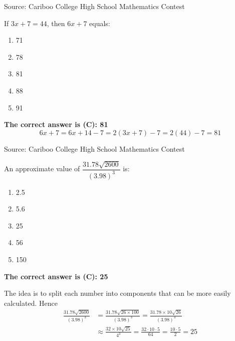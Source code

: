 \documentclass{article}
\begin{document}
\parindent=0cm
\parskip=6pt
\pagestyle{empty}



\scriptsize
Source: Cariboo College High School Mathematics Contest

\normalsize
If $3x+7=44$, then $6x+7$ equals:
\begin{enumerate}[noitemsep,topsep=0mm,leftmargin=*,widest=D,label=\Alph*)]
	\item 71
	\item 78
	\item 81
	\item 88
	\item 91
\end{enumerate}

\textbf{The correct answer is (C): 81}
\[
6x+7 = 6x+14-7 = 2(3x+7)-7=2(44)-7=81
\]

\vskip 1.5cm


\scriptsize
Source: Cariboo College High School Mathematics Contest

\normalsize
An approximate value of $\dfrac{31.78\sqrt{2600}}{(3.98)^3}$ is:
\begin{enumerate}[noitemsep,topsep=0mm,leftmargin=*,widest=D,label=\Alph*)]
	\item 2.5
	\item 5.6
	\item 25
	\item 56
	\item 150
\end{enumerate}

\textbf{The correct answer is (C): 25}

The idea is to split each number into components that can be more easily calculated. Hence
\begin{align*}
\frac{31.78\sqrt{2600}}{(3.98)^3} &= \frac{31.78\sqrt{26\times100}}{(3.98)^3} = \frac{31.78\times 10\sqrt{26}}{(3.98)^3}\\
&\approx \frac{32\times10\sqrt{25}}{4^3} = \frac{32\cdot10\cdot5}{64} = \frac{10\cdot5}{2} = 25
\end{align*}
\end{document}
